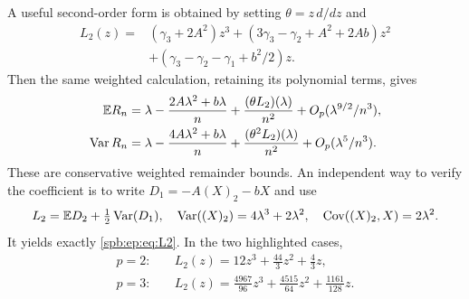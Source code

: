 A useful second-order form is obtained by setting $\theta=z\,d/dz$ and
\begin{align}\label{spb:ep:eq:L2}
 L_2(z)={}&(\gamma_3+2A^2)z^3
 +(3\gamma_3-\gamma_2+A^2+2Ab)z^2\nonumber\\
 &+(\gamma_3-\gamma_2-\gamma_1+b^2/2)z.
\end{align}
Then the same weighted calculation, retaining its polynomial terms, gives
\begin{align}
 \mathbb E R_n={}&\lambda-\frac{2A\lambda^2+b\lambda}{n}
            +\frac{(\theta L_2)(\lambda)}{n^2}
            +O_p(\lambda^{9/2}/n^3),\label{spb:ep:eq:mean2}\\
 \operatorname{Var} R_n={}&\lambda-\frac{4A\lambda^2+b\lambda}{n}
            +\frac{(\theta^2L_2)(\lambda)}{n^2}
            +O_p(\lambda^5/n^3).\label{spb:ep:eq:var2}
\end{align}
These are conservative weighted remainder bounds.
An independent way to verify the coefficient is to write
$D_1=-A(X)_2-bX$ and use
\[
 L_2=\mathbb E D_2+\tfrac12\operatorname{Var}(D_1),\quad
 \operatorname{Var}((X)_2)=4\lambda^3+2\lambda^2,\quad
 \operatorname{Cov}((X)_2,X)=2\lambda^2.
\]
It yields exactly \eqref{spb:ep:eq:L2}. In the two highlighted cases,
\begin{align*}
 p=2:\quad &L_2(z)=12z^3+\frac{44}{3}z^2+\frac43z,\\
 p=3:\quad &L_2(z)=\frac{4967}{96}z^3
                      +\frac{4515}{64}z^2+\frac{1161}{128}z.
\end{align*}

